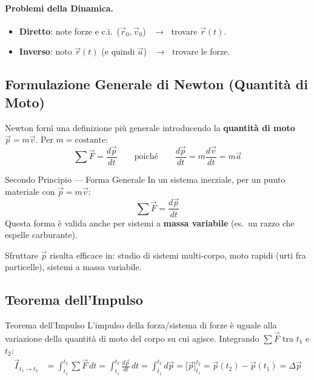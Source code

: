 \paragraph{Problemi della Dinamica.}
\begin{itemize}
    \item \textbf{Diretto}: note forze e c.i.\ ($\vec{r}_0,\vec{v}_0$)
          $\;\ \to\;$ trovare $\vec{r}(t)$.
    \item \textbf{Inverso}: noto $\vec{r}(t)$ (e quindi $\vec{a}$)
          $\;\ \to\;$ trovare le forze.
\end{itemize}

\subsection{Formulazione Generale di Newton (Quantità di Moto)}
Newton fornì una definizione più generale introducendo la
\textbf{quantità di moto} $\vec{p} = m\vec{v}$.
Per $m = \text{costante}$:
\begin{equation}
    \sum \vec{F} = \frac{d\vec{p}}{dt}
    \qquad\text{poiché}\qquad
    \frac{d\vec{p}}{dt} = m\frac{d\vec{v}}{dt} = m\vec{a}
\end{equation}

\begin{teorema}{Secondo Principio — Forma Generale}
In un sistema inerziale, per un punto materiale con
$\vec{p} = m\vec{v}$:
\begin{equation}\label{eq:2nd_general}
    \sum \vec{F} = \frac{d\vec{p}}{dt}
\end{equation}
Questa forma è valida anche per sistemi a \textbf{massa variabile}
(es.\ un razzo che espelle carburante).
\end{teorema}

\smallskip
Sfruttare $\vec{p}$ risulta efficace in: studio di sistemi multi-corpo,
moto rapidi (urti fra particelle), sistemi a massa variabile.

\subsection{Teorema dell'Impulso}
\begin{teorema}{Teorema dell'Impulso}
L'impulso della forza/sistema di forze è uguale alla variazione della
quantità di moto del corpo su cui agisce.
Integrando $\sum\vec{F}$ tra $t_1$ e $t_2$:
\begin{align*}
    \vec{I}_{t_1 \to t_2}
        &= \int_{t_1}^{t_2}\sum\vec{F}\,dt
         = \int_{t_1}^{t_2}\frac{d\vec{p}}{dt}\,dt
         = \int_{t_1}^{t_2}d\vec{p} 
        = \bigl[\vec{p}\bigr]_{t_1}^{t_2}
         = \vec{p}(t_2)-\vec{p}(t_1)
         = \Delta\vec{p}
\end{align*}
\end{teorema}

